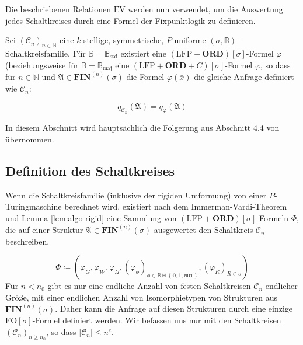Die beschriebenen Relationen $\bar{\mathrm{EV}}$ werden nun verwendet,
um die Auswertung jedes Schaltkreises durch eine Formel der Fixpunktlogik
zu definieren.
\begin{lem}
Sei $\left(\mathcal{C}_{n}\right)_{n\in\mathbb{N}}$ eine $k$-stellige,
symmetrische, $P$-uniforme $\left(\sigma,\mathbb{B}\right)$-Schaltkreisfamilie.
Für $\mathbb{B}=\mathbb{B}_{\mathrm{std}}$ existiert eine $\left(\mathrm{LFP}+\mathbf{ORD}\right)\left[\sigma\right]$-Formel
$\varphi$ (beziehungsweise für $\mathbb{B}=\mathbb{B}_{\mathrm{maj}}$
eine $\left(\mathrm{LFP}+\mathbf{ORD}+C\right)\left[\sigma\right]$-Formel
$\varphi$, so dass für $n\in\mathbb{N}$ und $\mathfrak{A}\in\mathbf{FIN}^{\left(n\right)}\left(\sigma\right)$
die Formel $\varphi\left(\bar{x}\right)$ die gleiche Anfrage definiert
wie $\mathcal{C}_{n}$:

\[
q_{\mathcal{C}_{n}}\left(\mathfrak{A}\right)=q_{\varphi}\left(\mathfrak{A}\right)
\]
\end{lem}
In diesem Abschnitt wird hauptsächlich die Folgerung aus Abschnitt
4.4 von \cite{AD2014} übernommen.

\subsection{\label{subsec:circuit-def}Definition des Schaltkreises}

Wenn die Schaltkreisfamilie (inklusive der rigiden Umformung) von
einer $P$-Turingmaschine berechnet wird, existiert nach dem Immerman-Vardi-Theorem\cite{Vardi:1982:CRQ:800070.802186,IMMERMAN198686}
und Lemma \ref{lem:algo-rigid} eine Sammlung von $\left(\mathrm{LFP}+\mathbf{ORD}\right)\left[\sigma\right]$-Formeln
$\Phi$, die auf einer Struktur $\mathfrak{A}\in\mathbf{FIN}^{\left(n\right)}\left(\sigma\right)$
ausgewertet den Schaltkreis $\mathcal{C}_{n}$ beschreiben.

\[
\Phi\coloneqq\left(\varphi_{G},\varphi_{\mathcal{W}},\varphi_{\Omega},\left(\varphi_{\phi}\right)_{\phi\in\mathbb{B}\uplus\left\{ \mathbf{0},\mathbf{1},\mathtt{NOT}\right\} },\left(\varphi_{R}\right)_{R\in\sigma}\right)
\]
Für $n<n_{0}$ gibt es nur eine endliche Anzahl von festen Schaltkreisen
$\mathcal{C}_{n}$ endlicher Größe, mit einer endlichen Anzahl von
Isomorphietypen von Strukturen aus $\mathbf{FIN}^{\left(n\right)}\left(\sigma\right)$.
Daher kann die Anfrage auf diesen Strukturen durch eine einzige $\mathrm{FO}\left[\sigma\right]$-Formel
definiert werden. Wir befassen uns nur mit den Schaltkreisen $\left(\mathcal{C}_{n}\right)_{n\geqslant n_{0}}$,
so dass $\left|\mathcal{C}_{n}\right|\leqslant n^{c}$.


